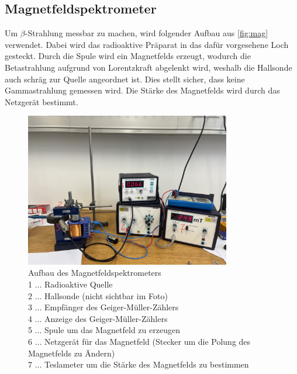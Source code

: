 \documentclass[12pt,english,ngerman]{scrartcl}
\begin{document}
\subsection{Magnetfeldspektrometer}\label{sec:aufbau_Magnetfeldspektrometer}

Um \(\beta\)-Strahlung messbar zu machen, wird folgender Aufbau aus
\autoref{fig:mag} verwendet. Dabei wird das radioaktive Präparat in das dafür
vorgesehene Loch gesteckt. Durch die Spule wird ein Magnetfelds erzeugt,
wodurch die Betastrahlung aufgrund von Lorentzkraft abgelenkt wird, weshalb die
Hallsonde auch schräg zur Quelle angeordnet ist. Dies stellt sicher, dass keine
Gammastrahlung gemessen wird. Die Stärke des Magnetfelds wird durch das
Netzgerät bestimmt.

\begin{figure}[H]
	\begin{center}
		\includegraphics[width = 0.8\textwidth]{./figures/mag_new.png}
	\end{center}
	\caption[Aufbau des Magnetfeldspektrometers]{
		Aufbau des Magnetfeldspektrometers              \\
		1 \(\dots\) Radioaktive Quelle                  \\
		2 \(\dots\) Hallsonde (nicht sichtbar im Foto)  \\
		3 \(\dots\) Empfänger des Geiger-Müller-Zählers \\
		4 \(\dots\) Anzeige des Geiger-Müller-Zählers   \\
		5 \(\dots\) Spule um das Magnetfeld zu erzeugen \\
		6 \(\dots\) Netzgerät für das Magnetfeld (Stecker um die Polung des Magnetfelds
		zu Ändern)                                      \\
		7 \(\dots\) Teslameter um die Stärke des Magnetfelds zu bestimmen
	}
	\label{fig:mag}

\end{figure}
\end{document}
